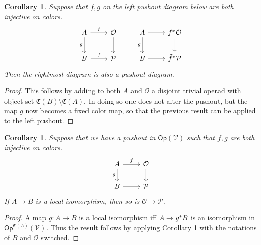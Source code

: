 \documentclass[a4paper,10pt
,draft
]{article}%
\numberwithin{equation}{section}
\numberwithin{figure}{section}
\newtheorem{corollary}[equation]{Corollary}%
\theoremstyle{definition} %
\newcommand{\Op}{\mathsf{Op}}%
\newcommand{\V}{\ensuremath{\mathcal V}}
\renewcommand{\O}{\ensuremath{\mathcal O}}
\renewcommand{\P}{\ensuremath{\mathcal P}}
\newcommand{\1}{\ensuremath{\mathbbm 1}}%
\begin{document}
\begin{corollary}\label{FGTPUSH COR}
Suppose that $f,g$ on the left pushout diagram below are both injective on colors.
\[
\begin{tikzcd}
	A \ar{r}{f} \ar{d}[swap]{g} & \mathcal{O} \ar{d}
&
	A \ar{r} \ar{d}[swap]{g} & f^{\**} \mathcal{O} \ar{d}
\\
	B \ar{r}{\tilde{f}} & \mathcal{P}
&
	B \ar{r} & \tilde{f}^{\**} \mathcal{P}
\end{tikzcd}
\]
Then the rightmost diagram is also a pushout diagram.
\end{corollary}

\begin{proof}
This follows by adding to both $A$ and $\mathcal{O}$ a disjoint trivial operad with object set $\mathfrak{C}(B) \setminus \mathfrak{C}(A)$. In doing so one does not alter the pushout, but the map $g$ now becomes a fixed color map, so that the previous result can be applied to the left pushout.
\end{proof}


\begin{corollary}
      \label{LOCALISO_COR}
      Suppose that we have a pushout in $\Op(\V)$ such that $f,g$ are both injective on colors.
      \[
            \begin{tikzcd}
                  A \arrow[d, "g"'] \arrow[r, "f"]
                  &
                  \O \arrow[d]
                  \\
                  B \arrow[r]
                  &
                  \P
            \end{tikzcd}
      \]
      If $A \to B$ is a local isomorphism, then so is $\O \to \P$.
\end{corollary}
\begin{proof}
      A map $g: A \to B$ is a local isomorphism iff $A \to g^{\**}B$ is an isomorphism in $\Op^{\mathfrak C(A)}(\V)$.
      Thus the result follows by applying Corollary \ref{FGTPUSH COR} with the notations of $B$ and $\O$ switched.      
\end{proof}

















\newpage
{}

\end{document}
